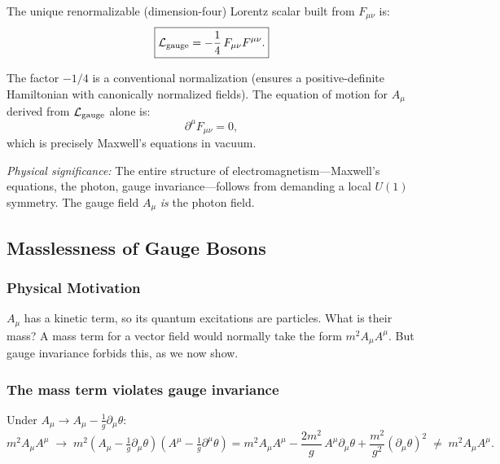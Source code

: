 \documentclass[../main.tex]{subfiles}
\begin{document}
The unique renormalizable (dimension-four) Lorentz scalar built from $F_{\mu\nu}$ is:
\begin{equation}
  \boxed{
  \mathcal{L}_{\rm gauge}
  =
  -\frac{1}{4}\,F_{\mu\nu}F^{\mu\nu}.}
  \label{eq:lec10:gauge-kinetic}
\end{equation}

The factor $-1/4$ is a conventional normalization (ensures a positive-definite Hamiltonian with canonically normalized fields).  The equation of motion for $A_\mu$ derived from $\mathcal{L}_{\rm gauge}$ alone is:
\begin{equation}
  \partial^\mu F_{\mu\nu} = 0,
  \label{eq:lec10:maxwell-vacuum}
\end{equation}
which is precisely Maxwell's equations in vacuum.

\textit{Physical significance:} The entire structure of electromagnetism—Maxwell's equations, the photon, gauge invariance—follows from demanding a local $U(1)$ symmetry.  The gauge field $A_\mu$ \emph{is} the photon field.

\subsection*{Masslessness of Gauge Bosons}

\subsubsection*{Physical Motivation}

$A_\mu$ has a kinetic term, so its quantum excitations are particles.  What is their mass?  A mass term for a vector field would normally take the form $m^2 A_\mu A^\mu$.  But gauge invariance forbids this, as we now show.

\subsubsection*{The mass term violates gauge invariance}

Under $A_\mu\to A_\mu - \frac{1}{g}\partial_\mu\theta$:
\begin{equation}
  m^2 A_\mu A^\mu
  \;\longrightarrow\;
  m^2\!\left(A_\mu - \tfrac{1}{g}\partial_\mu\theta\right)\!\left(A^\mu - \tfrac{1}{g}\partial^\mu\theta\right)
  =
  m^2 A_\mu A^\mu
  - \frac{2m^2}{g}\,A^\mu\partial_\mu\theta
  + \frac{m^2}{g^2}(\partial_\mu\theta)^2
  \;\neq\; m^2 A_\mu A^\mu.
  \label{eq:lec10:mass-term-not-invariant}
\end{equation}
\end{document}
